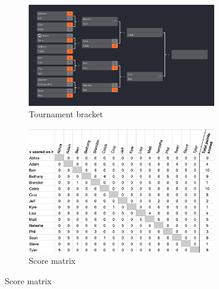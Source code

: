 \documentclass[letterpaper, 10 pt, conference]{ieeeconf}  %
\begin{document}
\begin{figure}[h!b]
        \centering
        \begin{subfigure}[ht]{0.5\textwidth}
                \centering
                \includegraphics[width=0.9\textwidth]{fig/singles-bracket_4.png}
                \caption{Tournament bracket}
        \end{subfigure}
        \begin{subfigure}[ht]{0.4\textwidth}
                \centering
                \includegraphics[width=0.9\textwidth]{fig/score-matrix_4.png}
                \caption{Score matrix}
        \end{subfigure}
        

\end{figure}
\end{document}

